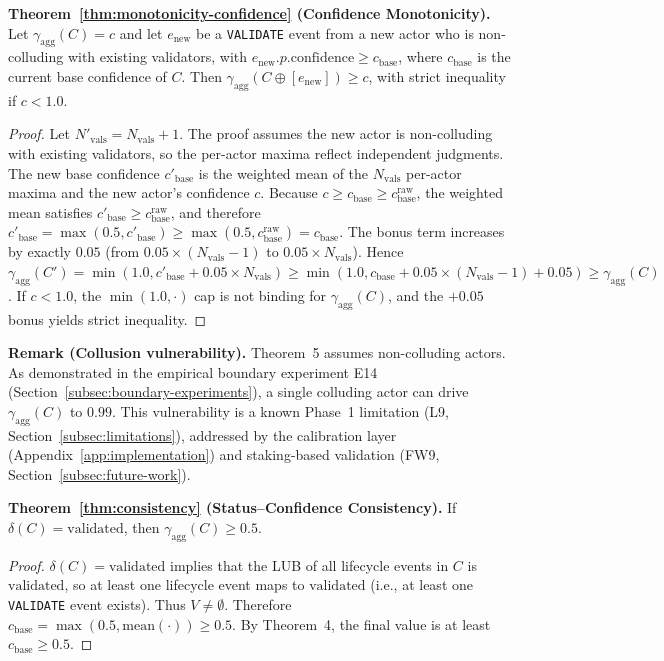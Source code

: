 \textbf{Theorem~\ref{thm:monotonicity-confidence} (Confidence Monotonicity).} Let $\gamma_{\text{agg}}(C) = c$ and let $e_{\text{new}}$ be a \texttt{VALIDATE} event from a new actor who is non-colluding with existing validators, with $e_{\text{new}}.p.\text{confidence} \geq c_{\text{base}}$, where $c_{\text{base}}$ is the current base confidence of $C$. Then $\gamma_{\text{agg}}(C \oplus [e_{\text{new}}]) \geq c$, with strict inequality if $c < 1.0$.
\begin{proof}
Let $N'_{\text{vals}} = N_{\text{vals}} + 1$. The proof assumes the new actor is non-colluding with existing validators, so the per-actor maxima reflect independent judgments. The new base confidence $c'_{\text{base}}$ is the weighted mean of the $N_{\text{vals}}$ per-actor maxima and the new actor's confidence $c$. Because $c \geq c_{\text{base}} \geq c_{\text{base}}^{\text{raw}}$, the weighted mean satisfies $c'_{\text{base}} \geq c_{\text{base}}^{\text{raw}}$, and therefore $c'_{\text{base}} = \max(0.5, c'_{\text{base}}) \geq \max(0.5, c_{\text{base}}^{\text{raw}}) = c_{\text{base}}$. The bonus term increases by exactly $0.05$ (from $0.05 \times (N_{\text{vals}} - 1)$ to $0.05 \times N_{\text{vals}}$). Hence $\gamma_{\text{agg}}(C') = \min(1.0, c'_{\text{base}} + 0.05 \times N_{\text{vals}}) \geq \min(1.0, c_{\text{base}} + 0.05 \times (N_{\text{vals}} - 1) + 0.05) \geq \gamma_{\text{agg}}(C)$. If $c < 1.0$, the $\min(1.0, \cdot)$ cap is not binding for $\gamma_{\text{agg}}(C)$, and the $+0.05$ bonus yields strict inequality.
\end{proof}

\textbf{Remark (Collusion vulnerability).} Theorem~5 assumes non-colluding actors. As demonstrated in the empirical boundary experiment E14 (Section~\ref{subsec:boundary-experiments}), a single colluding actor can drive $\gamma_{\text{agg}}(C)$ to $0.99$. This vulnerability is a known Phase~1 limitation (L9, Section~\ref{subsec:limitations}), addressed by the calibration layer (Appendix~\ref{app:implementation}) and staking-based validation (FW9, Section~\ref{subsec:future-work}).

\textbf{Theorem~\ref{thm:consistency} (Status--Confidence Consistency).} If $\delta(C) = \text{validated}$, then $\gamma_{\text{agg}}(C) \geq 0.5$.
\begin{proof}
$\delta(C) = \text{validated}$ implies that the LUB of all lifecycle events in $C$ is $\text{validated}$, so at least one lifecycle event maps to $\text{validated}$ (i.e., at least one \texttt{VALIDATE} event exists). Thus $V \neq \emptyset$. Therefore $c_{\text{base}} = \max(0.5, \text{mean}(\cdot)) \geq 0.5$. By Theorem~4, the final value is at least $c_{\text{base}} \geq 0.5$.
\end{proof}

